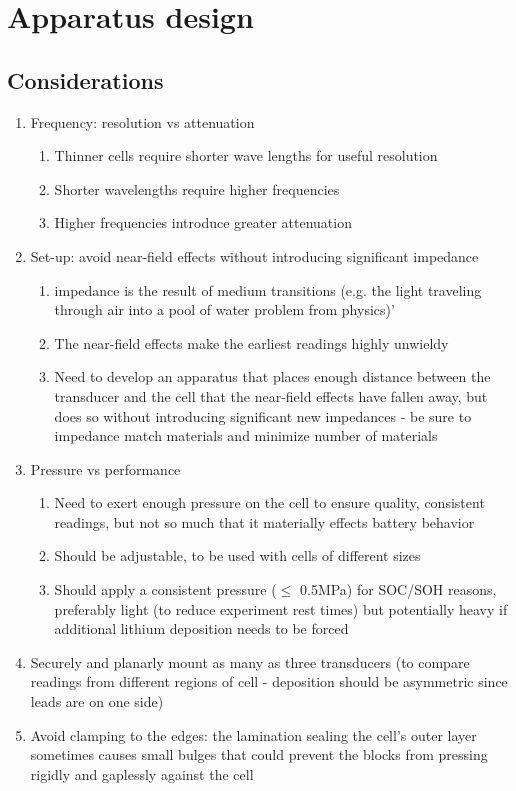 \chapter{Apparatus design}

\section{Considerations}
\begin{enumerate}
    \item Frequency: resolution vs attenuation
    \begin{enumerate}
        \item Thinner cells require shorter wave lengths for useful resolution
	    \item Shorter wavelengths require higher frequencies
		\item Higher frequencies introduce greater attenuation
	\end{enumerate}
	\item Set-up: avoid near-field effects without introducing significant impedance
		\begin{enumerate} 
		    \item impedance is the result of medium transitions (e.g. the light traveling through air into a pool of water problem from physics)'
		    \item The near-field effects make the earliest readings highly unwieldy
	        \item Need to develop an apparatus that places enough distance between the transducer and the cell that the near-field effects have fallen away, but does so without introducing significant new impedances - be sure to impedance match materials and minimize number of materials
	    \end{enumerate}
	\item Pressure vs performance
	    \begin{enumerate}
		\item Need to exert enough pressure on the cell to ensure quality, consistent readings, but not so much that it materially effects battery behavior
		\item Should be adjustable, to be used with cells of different sizes
		\item Should apply a consistent pressure ($\leq$ 0.5MPa) for SOC/SOH reasons, preferably light (to reduce experiment rest times) but potentially heavy if additional lithium deposition needs to be forced \cite{STACK-STRESS}
		\end{enumerate}
    \item Securely and planarly mount as many as three transducers (to compare readings from different regions of cell - deposition should be asymmetric since leads are on one side)
    \item Avoid clamping to the edges: the lamination sealing the cell's outer layer sometimes causes small bulges that could prevent the blocks from pressing rigidly and gaplessly against the cell
\end{enumerate}

